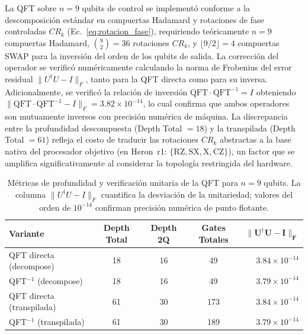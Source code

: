 \documentclass[12pt, spanish]{book}
\begin{document}
La QFT sobre $n = 9$ qubits de control se implementó conforme a la descomposición estándar en compuertas Hadamard y rotaciones de fase controladas $CR_k$ (Ec.~\ref{eq:rotacion_fase}), requiriendo teóricamente $n = 9$ compuertas Hadamard, $\binom{9}{2} = 36$ rotaciones $CR_k$, y $\lfloor 9/2 \rfloor = 4$ compuertas SWAP para la inversión del orden de los qubits de salida. La corrección del operador se verificó numéricamente calculando la norma de Frobenius del error residual $\|U^{\dagger}U - I\|_F$, tanto para la QFT directa como para su inversa. Adicionalmente, se verificó la relación de inversión $\mathrm{QFT} \cdot \mathrm{QFT}^{-1} = I$ obteniendo $\|\mathrm{QFT} \cdot \mathrm{QFT}^{-1} - I\|_F = 3.82 \times 10^{-14}$, lo cual confirma que ambos operadores son mutuamente inversos con precisión numérica de máquina. La discrepancia entre la profundidad descompuesta (Depth Total $= 18$) y la transpilada (Depth Total $= 61$) refleja el costo de traducir las rotaciones $CR_k$ abstractas a la base nativa del procesador objetivo (en Heron~r1: $\{\mathrm{RZ}, \mathrm{SX}, \mathrm{X}, \mathrm{CZ}\}$), un factor que se amplifica significativamente al considerar la topología restringida del hardware.

\begin{table}[H]
    \centering
    \caption{Métricas de profundidad y verificación unitaria de la QFT para $n = 9$ qubits. La columna $\|U^{\dagger}U - I\|_F$ cuantifica la desviación de la unitariedad; valores del orden de $10^{-14}$ confirman precisión numérica de punto flotante.}
    \label{tab:qft_metricas}
    \begin{tabular}{lcccr}
        \hline
        \textbf{Variante}         & \textbf{Depth Total} & \textbf{Depth 2Q} & \textbf{Gates Totales} & $\boldsymbol{\|U^{\dagger}U - I\|_F}$ \\
        \hline
        QFT directa (decompose)   & 18                   & 16                & 49                     & $3.84 \times 10^{-14}$                \\
        QFT$^{-1}$ (decompose)    & 18                   & 16                & 49                     & $3.79 \times 10^{-14}$                \\
        QFT directa (transpilada) & 61                   & 30                & 173                    & $3.84 \times 10^{-14}$                \\
        QFT$^{-1}$ (transpilada)  & 61                   & 30                & 189                    & $3.79 \times 10^{-14}$                \\
        \hline
    \end{tabular}
\end{table}
\end{document}
